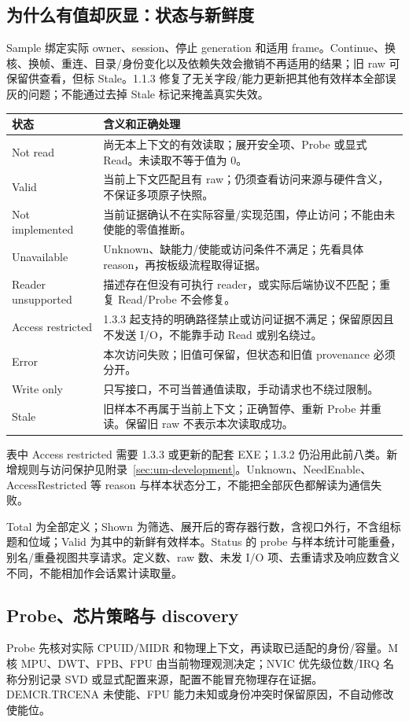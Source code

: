 \documentclass[UTF8,a4paper,11pt,oneside,fontset=none]{ctexart}
\begin{document}
\subsection{为什么有值却灰显：状态与新鲜度}
Sample 绑定实际 owner、session、停止 generation 和适用 frame。Continue、换核、换帧、重连、目录/身份变化以及依赖失效会撤销不再适用的结果；旧 raw 可保留供查看，但标 Stale。1.1.3 修复了无关字段/能力更新把其他有效样本全部误灰的问题；不能通过去掉 Stale 标记来掩盖真实失效。
\begin{longtable}{@{}P{31mm}P{130mm}@{}}
\toprule 状态 & 含义和正确处理\\\midrule\endhead
Not read & 尚无本上下文的有效读取；展开安全项、Probe 或显式 Read。未读取不等于值为 0。\\
Valid & 当前上下文匹配且有 raw；仍须查看访问来源与硬件含义，不保证多项原子快照。\\
Not implemented & 当前证据确认不在实际容量/实现范围，停止访问；不能由未使能的零值推断。\\
Unavailable & Unknown、缺能力/使能或访问条件不满足；先看具体 reason，再按板级流程取得证据。\\
Reader unsupported & 描述存在但没有可执行 reader，或实际后端协议不匹配；重复 Read/Probe 不会修复。\\
Access restricted & 1.3.3 起支持的明确路径禁止或访问证据不满足；保留原因且不发送 I/O，不能靠手动 Read 或别名绕过。\\
Error & 本次访问失败；旧值可保留，但状态和旧值 provenance 必须分开。\\
Write only & 只写接口，不可当普通值读取，手动请求也不绕过限制。\\
Stale & 旧样本不再属于当前上下文；正确暂停、重新 Probe 并重读。保留旧 raw 不表示本次读取成功。\\\bottomrule
\end{longtable}
表中 Access restricted 需要 1.3.3 或更新的配套 EXE；1.3.2 仍沿用此前八类。新增规则与访问保护见附录~\ref{sec:um-development}。Unknown、NeedEnable、AccessRestricted 等 reason 与样本状态分工，不能把全部灰色都解读为通信失败。

Total 为全部定义；Shown 为筛选、展开后的寄存器行数，含视口外行，不含组标题和位域；Valid 为其中的新鲜有效样本。Status 的 probe 与样本统计可能重叠，别名/重叠视图共享请求。定义数、raw 数、未发 I/O 项、去重请求及响应数含义不同，不能相加作会话累计读取量。

\subsection{Probe、芯片策略与 discovery}
Probe 先核对实际 CPUID/MIDR 和物理上下文，再读取已适配的身份/容量。M 核 MPU、DWT、FPB、FPU 由当前物理观测决定；NVIC 优先级位数/IRQ 名称分别记录 SVD 或显式配置来源，配置不能冒充物理存在证据。DEMCR.TRCENA 未使能、FPU 能力未知或身份冲突时保留原因，不自动修改使能位。
\end{document}

